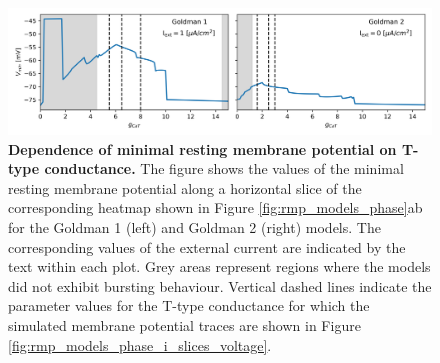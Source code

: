 \documentclass[../main.tex]{subfiles}
\begin{document}


\begin{figure}[!t]
    \centering
    \includegraphics[width=0.9\linewidth]{../img/rmp/goldman_1_2_i_slices.png}
    \caption[Dependence of minimal resting membrane potential on T-type conductance]{\textbf{Dependence of minimal resting membrane potential on T-type conductance.} The figure shows the values of the minimal resting membrane potential along a horizontal slice of the corresponding heatmap shown in Figure \ref{fig:rmp_models_phase}ab for the Goldman 1 (left) and Goldman 2 (right) models. The corresponding values of the external current are indicated by the text within each plot. Grey areas represent regions where the models did not exhibit bursting behaviour. Vertical dashed lines indicate the parameter values for the T-type conductance for which the simulated membrane potential traces are shown in Figure \ref{fig:rmp_models_phase_i_slices_voltage}.}
    \label{fig:rmp_models_phase_i_slices}
\end{figure}
\end{document}
